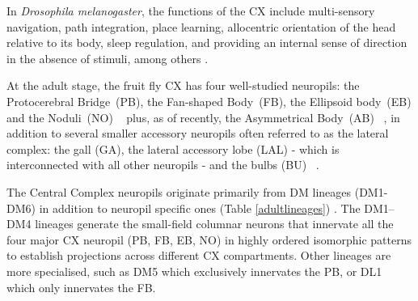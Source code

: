         In  \textit{Drosophila melanogaster}, the functions of the CX include multi-sensory navigation, path integration, place learning, allocentric orientation of the head relative to its body, sleep regulation, and providing an internal sense of direction in the absence of stimuli, among others \citep{hanesch1989neuronal, ofstad2011visual, seelig2013feature, PfeifferHomberg2014, Stone2017CXModel, franconville2018building, heinze2018principles, szuperak2018sleep, pisokas2020head, ShaferKeene2021sleep, fisher2022flexible}.

        At the adult stage, the fruit fly CX has four well-studied neuropils: the Protocerebral Bridge~(PB), the Fan-shaped Body~(FB), the Ellipsoid body~(EB) and the Noduli~(NO) ~\citep{hanesch1989neuronal} plus, as of recently, the Asymmetrical Body~(AB) ~\citep{wolff2018neuroarchitecture}, in addition to several smaller accessory neuropils often referred to as the lateral complex: the gall (GA), the lateral accessory lobe (LAL) - which is interconnected with all other neuropils -  and the bulbs (BU)  ~\citep{wolff2015neuroarchitecture, franconville2018building, hulse2021connectome}. 
        


        The Central Complex neuropils originate primarily from DM lineages (DM1-DM6) in addition to neuropil specific ones (Table \ref{adultlineages})  \citep{yang2013diverse,andrade2019developmentally}. %
        The DM1–DM4 lineages generate the small-field columnar neurons that innervate all the four major CX neuropil (PB, FB, EB, NO) in highly ordered isomorphic patterns to establish projections across different CX compartments. 
        Other lineages are more specialised, such as DM5 which exclusively innervates the PB, or DL1 which only innervates the FB. 

